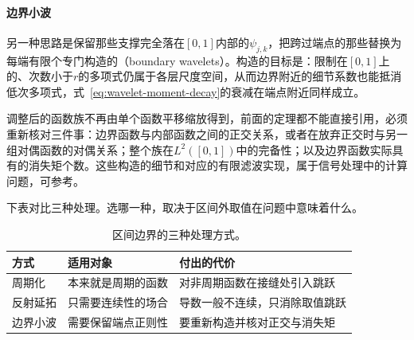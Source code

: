 \paragraph{边界小波}
另一种思路是保留那些支撑完全落在$[0,1]$内部的$\psi_{j,k}$，把跨过端点的那些替换为每端有限个专门构造的（boundary wavelets）。构造的目标是：限制在$[0,1]$上的、次数小于$r$的多项式仍属于各层尺度空间，从而边界附近的细节系数也能抵消低次多项式，式~\eqref{eq:wavelet-moment-decay}的衰减在端点附近同样成立。

调整后的函数族不再由单个函数平移缩放得到，前面的定理都不能直接引用，必须重新核对三件事：边界函数与内部函数之间的正交关系，或者在放弃正交时与另一组对偶函数的对偶关系；整个族在$L^2([0,1])$中的完备性；以及边界函数实际具有的消失矩个数。这些构造的细节和对应的有限滤波实现，属于信号处理中的计算问题，可参考。

下表对比三种处理。选哪一种，取决于区间外取值在问题中意味着什么。

\begin{table}[!htb]
\centering
\caption{区间边界的三种处理方式。}
\label{tab:wavelet-boundary-methods}
\begin{tabular}{lll}
\toprule
方式 & 适用对象 & 付出的代价\\
\midrule
周期化 & 本来就是周期的函数 & 对非周期函数在接缝处引入跳跃\\
反射延拓 & 只需要连续性的场合 & 导数一般不连续，只消除取值跳跃\\
边界小波 & 需要保留端点正则性 & 要重新构造并核对正交与消失矩\\
\bottomrule
\end{tabular}
\end{table}
